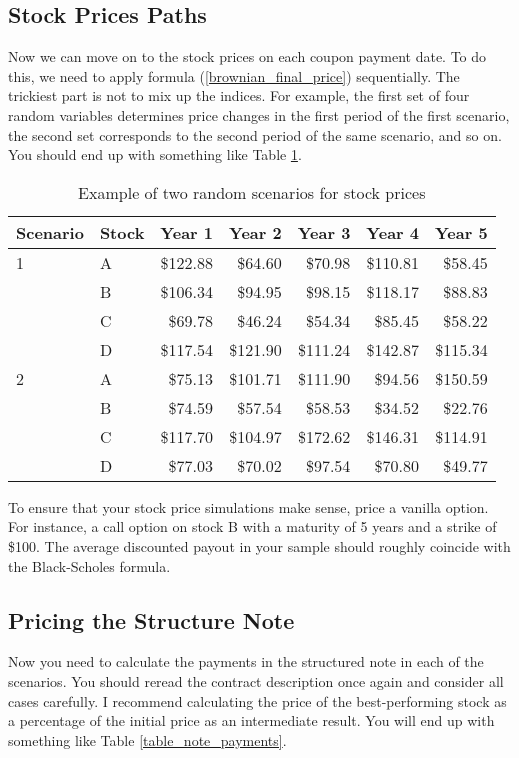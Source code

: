 \documentclass[a4paper,14pt]{extarticle}
\begin{document}
\subsection{Stock Prices Paths}

Now we can move on to the stock prices on each coupon payment date. To do this, we need to apply formula (\ref{brownian_final_price}) sequentially. The trickiest part is not to mix up the indices. For example, the first set of four random variables determines price changes in the first period of the first scenario, the second set corresponds to the second period of the same scenario, and so on. You should end up with something like Table \ref{table_stock_prices}.

\begin{table}[h]
\centering
\begin{tabular}{l|l|r|r|r|r|r}
Scenario & Stock & Year 1 & Year 2 & Year 3 & Year 4 & Year 5 \\
\hline
1 & A & \$122.88 &  \$64.60 &  \$70.98 & \$110.81 &  \$58.45 \\
  & B & \$106.34 &  \$94.95 &  \$98.15 & \$118.17 &  \$88.83 \\
  & C &  \$69.78 &  \$46.24 &  \$54.34 &  \$85.45 &  \$58.22 \\
  & D & \$117.54 & \$121.90 & \$111.24 & \$142.87 & \$115.34 \\
\hline
2 & A &  \$75.13 & \$101.71 & \$111.90 &  \$94.56 & \$150.59 \\
  & B &  \$74.59 &  \$57.54 &  \$58.53 &  \$34.52 &  \$22.76 \\
  & C & \$117.70 & \$104.97 & \$172.62 & \$146.31 & \$114.91 \\
  & D &  \$77.03 &  \$70.02 &  \$97.54 &  \$70.80 &  \$49.77
\end{tabular}
\caption{Example of two random scenarios for stock prices}
\label{table_stock_prices}
\end{table}

To ensure that your stock price simulations make sense, price a vanilla option. For instance, a call option on stock B with a maturity of 5 years and a strike of \$100. The average discounted payout in your sample should roughly coincide with the Black-Scholes formula.

\subsection{Pricing the Structure Note}

Now you need to calculate the payments in the structured note in each of the scenarios. You should reread the contract description once again and consider all cases carefully. I recommend calculating the price of the best-performing stock as a percentage of the initial price as an intermediate result. You will end up with something like Table \ref{table_note_payments}.
\end{document}
